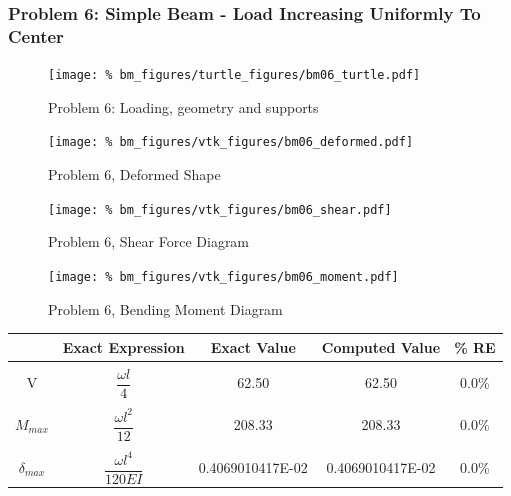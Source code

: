 \subsubsection{Problem 6: Simple Beam - Load Increasing Uniformly To Center}
\begin{figure}[h]
    \texttt{[image: \%
                            bm\_figures/turtle\_figures/bm06\_turtle.pdf]}
    \centering
    \caption{Problem 6: Loading, geometry and supports}
    \label{fig:bm06_turtle}
\end{figure}


\begin{figure}[!htb]
    \texttt{[image: \%
                     bm\_figures/vtk\_figures/bm06\_deformed.pdf]}
    \centering
    \caption{Problem 6, Deformed Shape}
    \label{fig:bm06_deformed}
\end{figure}
\begin{figure}[!htb]
    \texttt{[image: \%
                     bm\_figures/vtk\_figures/bm06\_shear.pdf]}
    \centering
    \caption{Problem 6, Shear Force Diagram}
    \label{fig:bm06_shear}
\end{figure}
\begin{figure}[!htb]
    \texttt{[image: \%
                     bm\_figures/vtk\_figures/bm06\_moment.pdf]}
    \centering
    \caption{Problem 6, Bending Moment Diagram}
    \label{fig:bm06_moment}
\end{figure}
\begin{table}[h!]
\centering
\begin{tabular}{ c| c c c c }
    & Exact Expression & Exact Value & Computed Value & \% RE \\ \hline \\
    V   & $\dfrac{\omega l}{4}$ &  62.50 & 62.50 & 0.0\% \\ \\
    $M_{max}$ & $\dfrac{\omega l^2}{12}$ &  208.33 & 208.33 & 0.0\% \\ \\
    $\delta_{max}$ & $\dfrac{\omega l^4}{120EI}$ & 0.4069010417E-02 & 0.4069010417E-02 & 0.0\% \\
\end{tabular}
\end{table}

%
%

\clearpage
